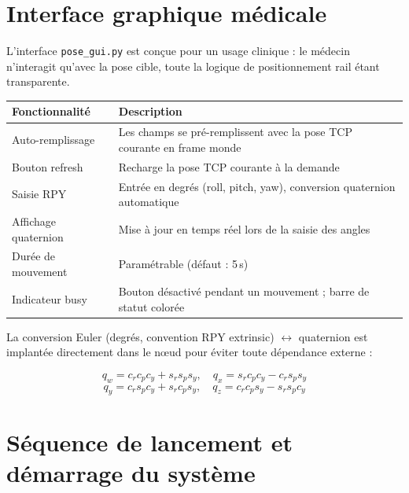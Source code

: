 \documentclass[11pt, a4paper]{article}
\begin{document}
\section{Interface graphique médicale}

L'interface \texttt{pose\_gui.py} est conçue pour un usage clinique : le médecin n'interagit qu'avec la pose cible, toute la logique de positionnement rail étant transparente.

\begin{center}
\begin{tabular}{ll}
  \toprule
  \rowcolor{LightBlue}
  \textbf{Fonctionnalité} & \textbf{Description} \\
  \midrule
  Auto-remplissage       & Les champs se pré-remplissent avec la pose TCP courante en frame monde \\
  Bouton refresh         & Recharge la pose TCP courante à la demande \\
  Saisie RPY             & Entrée en degrés (roll, pitch, yaw), conversion quaternion automatique \\
  Affichage quaternion   & Mise à jour en temps réel lors de la saisie des angles \\
  Durée de mouvement     & Paramétrable (défaut : 5\,s) \\
  Indicateur busy        & Bouton désactivé pendant un mouvement ; barre de statut colorée \\
  \bottomrule
\end{tabular}
\end{center}

La conversion Euler (degrés, convention RPY extrinsic) $\leftrightarrow$ quaternion est implantée directement dans le nœud pour éviter toute dépendance externe :

\begin{equation}
  q_w = c_r c_p c_y + s_r s_p s_y, \quad
  q_x = s_r c_p c_y - c_r s_p s_y
\end{equation}
\begin{equation}
  q_y = c_r s_p c_y + s_r c_p s_y, \quad
  q_z = c_r c_p s_y - s_r s_p c_y
\end{equation}

\section{Séquence de lancement et démarrage du système}
\end{document}
